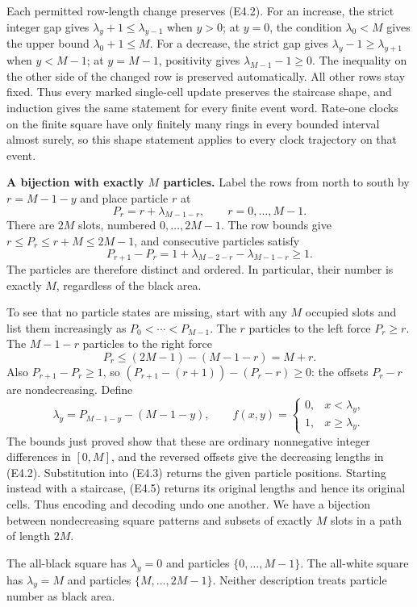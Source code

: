 \documentclass[
  11pt,
  a4paper,
]{article}
\begin{document}
Each permitted row-length change preserves (E4.2). For an increase, the
strict integer gap gives \(\lambda_y+1\leq\lambda_{y-1}\) when \(y>0\);
at \(y=0\), the condition \(\lambda_0<M\) gives the upper bound
\(\lambda_0+1\leq M\). For a decrease, the strict gap gives
\(\lambda_y-1\geq\lambda_{y+1}\) when \(y<M-1\); at \(y=M-1\),
positivity gives \(\lambda_{M-1}-1\geq0\). The inequality on the other
side of the changed row is preserved automatically. All other rows stay
fixed. Thus every marked single-cell update preserves the staircase
shape, and induction gives the same statement for every finite event
word. Rate-one clocks on the finite square have only finitely many rings
in every bounded interval almost surely, so this shape statement applies
to every clock trajectory on that event.

\textbf{A bijection with exactly \(M\) particles.} Label the rows from
north to south by \(r=M-1-y\) and place particle \(r\) at \[
P_r=r+\lambda_{M-1-r},\qquad r=0,\ldots,M-1.
\tag{E4.3}
\] There are \(2M\) slots, numbered \(0,\ldots,2M-1\). The row bounds
give \(r\leq P_r\leq r+M\leq2M-1\), and consecutive particles satisfy \[
P_{r+1}-P_r
=1+\lambda_{M-2-r}-\lambda_{M-1-r}\geq1.
\tag{E4.4}
\] The particles are therefore distinct and ordered. In particular,
their number is exactly \(M\), regardless of the black area.

To see that no particle states are missing, start with any \(M\)
occupied slots and list them increasingly as \(P_0<\cdots<P_{M-1}\). The
\(r\) particles to the left force \(P_r\geq r\). The \(M-1-r\) particles
to the right force \[
P_r\leq(2M-1)-(M-1-r)=M+r.
\] Also \(P_{r+1}-P_r\geq1\), so \((P_{r+1}-(r+1))-(P_r-r)\geq0\): the
offsets \(P_r-r\) are nondecreasing. Define \[
\lambda_y=P_{M-1-y}-(M-1-y),\qquad
f(x,y)=\begin{cases}0,&x<\lambda_y,\\1,&x\geq\lambda_y.\end{cases}
\tag{E4.5}
\] The bounds just proved show that these are ordinary nonnegative
integer differences in \([0,M]\), and the reversed offsets give the
decreasing lengths in (E4.2). Substitution into (E4.3) returns the given
particle positions. Starting instead with a staircase, (E4.5) returns
its original lengths and hence its original cells. Thus encoding and
decoding undo one another. We have a bijection between nondecreasing
square patterns and subsets of exactly \(M\) slots in a path of length
\(2M\).

The all-black square has \(\lambda_y=0\) and particles
\(\{0,\ldots,M-1\}\). The all-white square has \(\lambda_y=M\) and
particles \(\{M,\ldots,2M-1\}\). Neither description treats particle
number as black area.
\end{document}
